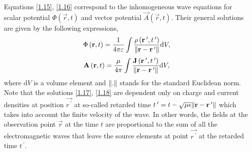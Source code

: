Equations \ref{1.15}, \ref{1.16} correspond to the inhomogeneous wave equations for scalar potential $ \Phi\left(\vec{r}, t \right) $ and vector potential $ \vec{A}\left(\vec{r}, t \right) $. Their general solutions are given by the following expressions,
\begin{equation}
\label{1.17}
\Phi\left(\mathbf{r}, t \right) = \frac{1}{4 \pi \varepsilon} \int \frac{\rho\left(\mathbf{r^{\: \prime}}, t^{\: \prime} \right)}{\lVert\mathbf{r} - \mathbf{r^{\: \prime}}\rVert} \mathrm{d} V,
\end{equation}
\begin{equation}
\label{1.18}
\mathbf{A}\left(\mathbf{r}, t \right) = \frac{\mu}{4 \pi} \int \frac{\mathbf{J}\left(\mathbf{r^{\: \prime}}, t^{\: \prime} \right)}{\lVert\mathbf{r} - \mathbf{r^{\: \prime}}\rVert} \mathrm{d} V,
\end{equation}
where $ \mathrm{d} V $ is a volume element and $ \lVert.\rVert $ stands for the standard Euclidean norm. Note that the solutions \ref{1.17}, \ref{1.18} are dependent only on charge and current densities at position $ \vec{r^{\: \prime}} $ at so-called retarded time $ t^{\: \prime} = t - \sqrt{\mu \epsilon} \lVert\mathbf{r} - \mathbf{r^{\: \prime}}\rVert $ which takes into account the finite velocity of the wave. In other words, the fields at the observation point $ \vec{r} $ at the time $ t $ are proportional to the sum of all the electromagnetic waves that leave the source elements at point $ \vec{r^{\: \prime}} $ at the retarded time $ t^{\: \prime} $.